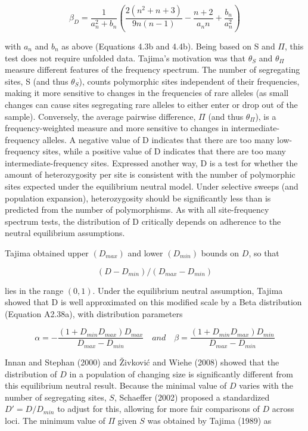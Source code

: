 \documentclass{article}
\begin{document}
\begin{equation}
\beta_{D}=\frac{1}{a_{n}^{2}+b_{n}}\left(\frac{2(n^{2}+n+3)}{9n(n-1)}-\frac{n+2}{a_{n}n}+\frac{b_{n}}{a_{n}^{2}}\right)
\tag{9.24c}
\label{eq:9_24c}
\end{equation}

with  $ a_{n} $ and  $ b_{n} $ as above (Equations 4.3b and 4.4b). Being based on S and  $ \Pi $, this test does not require unfolded data. Tajima's motivation was that  $ \theta_{S} $ and  $ \theta_{\Pi} $ measure different features of the frequency spectrum. The number of segregating sites, S (and thus  $ \theta_{S} $), counts polymorphic sites independent of their frequencies, making it more sensitive to changes in the frequencies of rare alleles (as small changes can cause sites segregating rare alleles to either enter or drop out of the sample). Conversely, the average pairwise difference,  $ \Pi $ (and thus  $ \theta_{\Pi} $), is a frequency-weighted measure and more sensitive to changes in intermediate-frequency alleles. A negative value of D indicates that there are too many low-frequency sites, while a positive value of D indicates that there are too many intermediate-frequency sites. Expressed another way, D is a test for whether the amount of heterozygosity per site is consistent with the number of polymorphic sites expected under the equilibrium neutral model. Under selective sweeps (and population expansion), heterozygosity should be significantly less than is predicted from the number of polymorphisms. As with all site-frequency spectrum tests, the distribution of D critically depends on adherence to the neutral equilibrium assumptions.

Tajima obtained upper  $ (D_{max}) $ and lower  $ (D_{min}) $ bounds on  $ D $, so that

\begin{equation}
(D-D_{min})/(D_{max}-D_{min})
\end{equation}

lies in the range  $ (0, 1) $. Under the equilibrium neutral assumption, Tajima showed that D is well approximated on this modified scale by a Beta distribution (Equation A2.38a), with distribution parameters

\begin{equation}
\alpha=-\frac{(1+D_{min}D_{max})D_{max}}{D_{max}-D_{min}}\quad and\quad\beta=\frac{(1+D_{min}D_{max})D_{min}}{D_{max}-D_{min}}
\tag{9.25a}
\label{eq:9_25a}
\end{equation}

Innan and Stephan (2000) and Živković and Wiehe (2008) showed that the distribution of $D$ in a population of changing size is significantly different from this equilibrium neutral result. Because the minimal value of $D$ varies with the number of segregating sites, $S$, Schaeffer (2002) proposed a standardized $D' = D/D_{min}$ to adjust for this, allowing for more fair comparisons of $D$ across loci. The minimum value of $\Pi$ given $S$ was obtained by Tajima (1989) as
\end{document}
